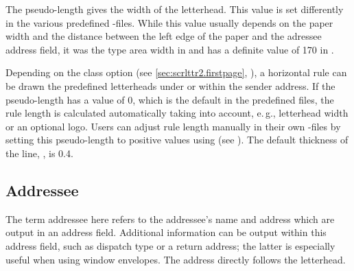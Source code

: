 \begin{Declaration}
\end{Declaration}
The pseudo-length  gives the width of the
letterhead. This value is set differently in the various predefined
-files.
While this value usually depends on the paper width and the distance between
the left edge of the paper and the adressee address field, it was the type
area width in  and has a definite value of 170 in
.%
%
\EndIndexGroup


\begin{Declaration}
\end{Declaration}
Depending on the class option  (see
\autoref{sec:scrlttr2.firstpage},
), a horizontal rule can be drawn
the predefined letterheads under or within the sender
address. If the pseudo-length  has
a value of 0, which is the default in the predefined 
files, the rule length is calculated automatically taking into account,
e.\,g., letterhead width or an optional logo. Users can adjust rule length
manually in their own -files by setting this pseudo-length to
positive values using \Macro{\@setplength} (see
). The default thickness of
the line, , is
0.4.%
%
\EndIndexGroup
%
\EndIndexGroup


\subsection{Addressee}
%
\BeginIndexGroup
{}

The term addressee here refers to the addressee's name and address which
are output in an address field. Additional information can be output
within this address field, such as dispatch type or a return address;
the latter is especially useful when using window envelopes. The
address directly follows the letterhead.

